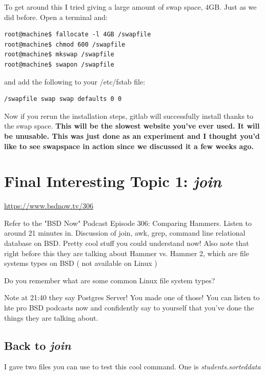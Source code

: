 \documentclass[10pt]{article}
\begin{document}
To get around this I tried giving a large amount of swap space, 4GB.
Just as we did before. Open a terminal and:

\begin{lstlisting}
root@machine$ fallocate -l 4GB /swapfile
root@machine$ chmod 600 /swapfile
root@machine$ mkswap /swapfile
root@machine$ swapon /swapfile
\end{lstlisting}

and add the following to your /etc/fstab file:

\begin{verbatim}
/swapfile swap swap defaults 0 0
\end{verbatim}


Now if you rerun the installation steps, gitlab will successfully install thanks
to the swap space. \textbf{This will be the slowest website you've ever used. It
will be unusable. This was just done as an experiment and I thought you'd like
to see swapspace in action since we discussed it a few weeks ago.}

\section{Final Interesting Topic 1: \textit{join}}

\begin{center}
\url{https://www.bsdnow.tv/306}
\end{center}

Refer to the "BSD Now" Podcast Episode 306: Comparing Hammers. Listen to around
21 minutes in. Discussion of join, awk, grep, command line relational database
on BSD. Pretty cool stuff you could understand now! Also note that right before
this they are talking about Hammer vs. Hammer 2, which are file systems types on
BSD ( not available on Linux )

Do you remember what are some common Linux file system types?

Note at 21:40 they say Postgres Server! You made one of those! You can listen to
hte pro BSD podcasts now and confidently say to yourself that you've done the
things they are talking about.

\subsection{Back to \textit{join}}
I gave two files you can use to test this cool command. One is
\textit{students.sorteddata}


\end{document}
